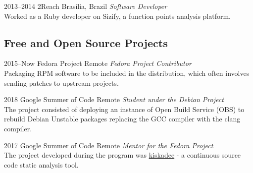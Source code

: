 \documentclass[print]{friggeri-cv}
\begin{document}
\begin{entrylist}


\entry
{2013--2014}
{2Reach}
{Brasília, Brazil}
{\emph{Software Developer} \\
  Worked as a Ruby developer on Sizify, a function points analysis platform.
  }




\end{entrylist}

\subsection{Free and Open Source Projects}

\begin{entrylist}

\entry
{2015--Now}
{Fedora Project}
{Remote}
{\emph{Fedora Project Contributor} \\
Packaging RPM software to be included in the distribution, which often involves sending patches to upstream projects.
  }

\end{entrylist}
\begin{entrylist}


\entry
{2018}
{Google Summer of Code}
{Remote}
{\emph{Student under the Debian Project} \\
  The project consisted of deploying an instance of Open Build Service (OBS) to
  rebuild Debian Unstable packages replacing the GCC compiler with the clang
  compiler. \\
 }


\entry
{2017}
{Google Summer of Code}
{Remote}
{\emph{Mentor for the Fedora Project} \\
  The project developed during the program was
  \href{pagure.io/kiskadee}{kiskadee} - a continuous source code static
  analysis tool. \\
 }


\end{entrylist}
\end{document}
